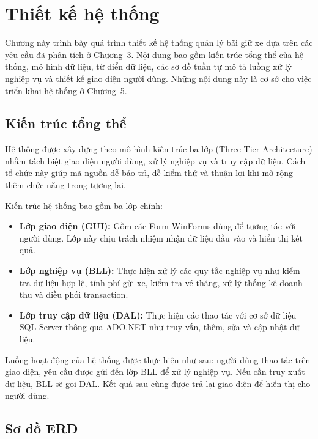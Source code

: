 \chapter{Thiết kế hệ thống}

Chương này trình bày quá trình thiết kế hệ thống quản lý bãi giữ xe dựa trên các yêu cầu đã phân tích ở Chương~3. Nội dung bao gồm kiến trúc tổng thể của hệ thống, mô hình dữ liệu, từ điển dữ liệu, các sơ đồ tuần tự mô tả luồng xử lý nghiệp vụ và thiết kế giao diện người dùng. Những nội dung này là cơ sở cho việc triển khai hệ thống ở Chương~5.

\section{Kiến trúc tổng thể}

Hệ thống được xây dựng theo mô hình kiến trúc ba lớp (Three-Tier Architecture) nhằm tách biệt giao diện người dùng, xử lý nghiệp vụ và truy cập dữ liệu. Cách tổ chức này giúp mã nguồn dễ bảo trì, dễ kiểm thử và thuận lợi khi mở rộng thêm chức năng trong tương lai.

Kiến trúc hệ thống bao gồm ba lớp chính:

\begin{itemize}
    \item \textbf{Lớp giao diện (GUI):} Gồm các Form WinForms dùng để tương tác với người dùng. Lớp này chịu trách nhiệm nhận dữ liệu đầu vào và hiển thị kết quả.

    \item \textbf{Lớp nghiệp vụ (BLL):} Thực hiện xử lý các quy tắc nghiệp vụ như kiểm tra dữ liệu hợp lệ, tính phí gửi xe, kiểm tra vé tháng, xử lý thống kê doanh thu và điều phối transaction.

    \item \textbf{Lớp truy cập dữ liệu (DAL):} Thực hiện các thao tác với cơ sở dữ liệu SQL Server thông qua ADO.NET như truy vấn, thêm, sửa và cập nhật dữ liệu.
\end{itemize}

Luồng hoạt động của hệ thống được thực hiện như sau: người dùng thao tác trên giao diện, yêu cầu được gửi đến lớp BLL để xử lý nghiệp vụ. Nếu cần truy xuất dữ liệu, BLL sẽ gọi DAL. Kết quả sau cùng được trả lại giao diện để hiển thị cho người dùng.

\section{Sơ đồ ERD}

